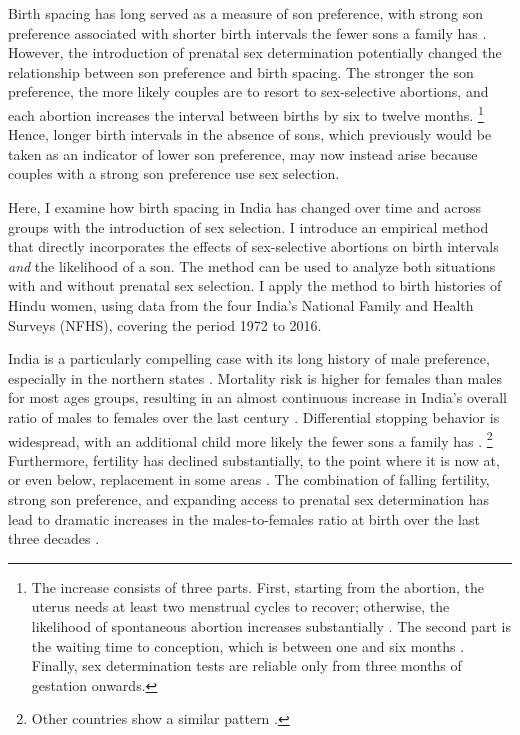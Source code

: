 \documentclass[12pt,letterpaper]{article}
\begin{document}
Birth spacing has long served as a measure of son preference, with strong
son preference associated with shorter birth intervals the
fewer sons a family has \citep{ben-porath76b,Leung1988}.
However, the introduction of prenatal sex determination potentially 
changed the relationship between son preference and birth spacing.
The stronger the son preference, the more likely couples are to resort to sex-selective 
abortions, and each abortion increases the interval between births by six to twelve 
months.%
\footnote{
The increase consists of three parts.
First, starting from the abortion, the uterus needs at 
least two menstrual cycles to recover;  otherwise, the likelihood 
of spontaneous abortion increases substantially \citep{zhou00b}.
The second part is the waiting time to conception, which is between 
one and six months \citep{Wang2003}.
Finally, sex determination tests are reliable only from three months 
of gestation onwards.
}
Hence, longer birth intervals in the absence of sons, which previously would be taken as 
an indicator of lower son preference, may now instead arise because couples with a strong 
son preference use sex selection.

Here, I examine how birth spacing in India has changed over time and across 
groups with the introduction of sex selection.
I introduce an empirical method that directly incorporates the effects of 
sex-selective abortions on birth intervals
\emph{and} 
the likelihood of a son. 
The method can be used to analyze both situations with and without prenatal
sex selection.
I apply the method to birth histories of Hindu women, using data from the four
India's National Family and Health Surveys (NFHS), covering the period 
1972 to 2016. 


India is a particularly compelling case with its long history of male preference, 
especially in the northern states \citep{Kishor1993,murthi95,arnold98}.
Mortality risk is higher for females than males for most ages groups, resulting in
an almost continuous increase in India's overall ratio of males to females 
over the last century \citep{dyson01,Navaneetham2011,Bongaarts2015}.
Differential stopping behavior is widespread, with an additional child more likely the
fewer sons a family has 
\citep{repetto72,Das1987,Arnold1997,arnold98,clark00,Basu2010,Barcellos2014}.%
\footnote{
Other countries show a similar pattern
\citep[see, for example,][]{larsen98,filmer09,Altindag2016}.
}
Furthermore, fertility has declined substantially, to the point where it is now at, or even 
below, replacement in some areas 
\citep{Guilmoto2013,Dharmalingam2014,International-Institute-for-Population-Sciences-IIPS2017}.
The combination of falling fertility, strong son preference, and expanding access to 
prenatal sex determination has lead to dramatic increases in the males-to-females ratio at 
birth over the last three decades
\citep{das_gupta97,Sudha1999,Arnold2002,retherford03b,jha06,Guilmoto2009a,Guilmoto2012,Bongaarts2013,Portner2015b,Jayachandran2017}.
\end{document}
